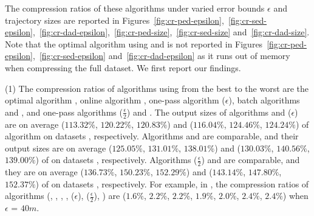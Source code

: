 The compression ratios of these algorithms under varied error bounds $\epsilon$ and trajectory sizes are reported in Figures~\ref{fig:cr-ped-epsilon},~\ref{fig:cr-sed-epsilon},~\ref{fig:cr-dad-epsilon},~\ref{fig:cr-ped-size},~\ref{fig:cr-sed-size} and~\ref{fig:cr-dad-size}.
{Note that the optimal algorithm using \sed and \dad is not reported in Figures~\ref{fig:cr-ped-epsilon},~\ref{fig:cr-sed-epsilon} and~\ref{fig:cr-dad-epsilon} as it runs out of memory when compressing the full dataset}. We first report our findings.




\sstab(1) The compression ratios of algorithms using \ped from the best
to the worst are the optimal algorithm \opt, online algorithm \bqsa, one-pass algorithm \siped($\epsilon$), batch algorithms \tpa and \dpa, and one-pass algorithms \siped($\frac{\epsilon}{2}$) and \operb.
The output sizes of algorithms \bqsa and \siped({$\epsilon$}) are on average
($113.32\%$, $120.22\%$, $120.83\%$) and ($116.04\%$, $124.46\%$, $124.24\%$) of algorithm \opt
on datasets \dSets, respectively.
Algorithms \tpa and \dpa are comparable, and their output sizes are on average
($125.05\%$, $131.01\%$, $138.01\%$) and ($130.03\%$, $140.56\%$, $139.00\%$) of \opt
on datasets \dSets, respectively.
Algorithms \siped($\frac{\epsilon}{2}$) and \operb are comparable, and they are on average
($136.73\%$, $150.23\%$, $152.29\%$) and ($143.14\%$, $147.80\%$, $152.37\%$) of \opt on datasets \dSets, respectively.
%
For example, in \mopsi, the compression ratios of algorithms
(\opt, \tpa, \dpa, \bqsa, \siped(${\epsilon}$), \siped($\frac{\epsilon}{2}$), \operb ) are ($1.6\%$, $2.2\%$, $2.2\%$, $1.9\%$, $2.0\%$, $2.4\%$, $2.4\%$) when $\epsilon$ = $40m$.
%

